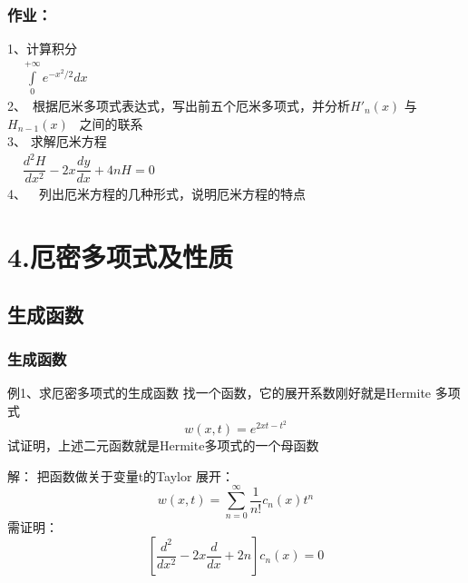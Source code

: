 \begin{frame}
	\frametitle{作业：}
	1、计算积分\\ 
	$\begin{array}{lllllllll}
		 &\int\limits_{0}^{+\infty} e^{-x^2 /2} dx
	\end{array}$ \\ \vspace{0.6em}
	2、 根据厄米多项式表达式，写出前五个厄米多项式，并分析$H'_n (x)$ 与$H_{n-1} (x)$  之间的联系\\ \vspace{0.6em}
	3、 求解厄米方程\\ \vspace{0.6em}
	$\begin{array}{lllllllll}
		& \dfrac{d^2 H}{d x^2} -2x \dfrac{d y}{d x} +4n H =0 		
	\end{array}$ \\ \vspace{0.6em}
	4、  列出厄米方程的几种形式，说明厄米方程的特点
\end{frame}

\section{4.厄密多项式及性质}

\subsection{生成函数}

\begin{frame}
	\frametitle{ 生成函数 }
	\begin{exampleblock} { 例1、求厄密多项式的生成函数 }
		找一个函数，它的展开系数刚好就是Hermite 多项式
		 \begin{equation*}
			w(x,t)=e^{2xt-t^2}
		\end{equation*}
		试证明，上述二元函数就是Hermite多项式的一个母函数
	\end{exampleblock}
	\alert {解：}	把函数做关于变量t的Taylor 展开：
	\begin{equation*}
		w(x,t) =\sum_{n=0}^{\infty} \frac{1}{n!}  c_n(x) t^n
	\end{equation*}
	需证明：
	\begin{equation*}
		\left[  \frac{d^2}{dx^2} -2x\frac{d}{dx} +2n  \right] c_n(x)=0
	\end{equation*}
\end{frame}

